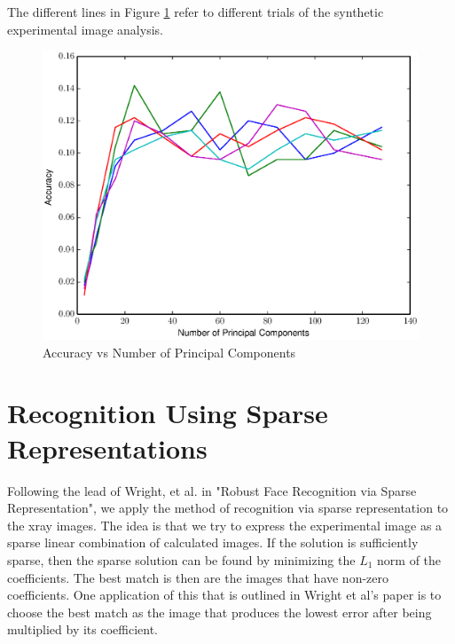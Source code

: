 \documentclass[12pt,letterpaper]{article}
\begin{document}
The different lines in Figure \ref{f:accByPC} refer to different trials of the
synthetic experimental image analysis.

\begin{figure}[ht]
  \begin{center}
    \includegraphics[scale=0.8]{figs/accuracyByNumberOfPCs.eps}
    \caption{Accuracy vs Number of Principal Components\label{f:accByPC}}
  \end{center}
\end{figure}
\clearpage

\section{Recognition Using Sparse Representations}
Following the lead of Wright, et al. in "Robust Face Recognition via Sparse
Representation", we apply the method of recognition via sparse representation
to the xray images. The idea is that we try to express the experimental image as
a sparse linear combination of calculated images. If the solution is
sufficiently sparse, then the sparse solution can be found by minimizing the
$L_1$ norm of the coefficients.  The best match is then are the images that have
non-zero coefficients. One application of this that is outlined in Wright et
al's paper is to choose the best match as the image that produces the lowest
error after being multiplied by its coefficient.
\end{document}

